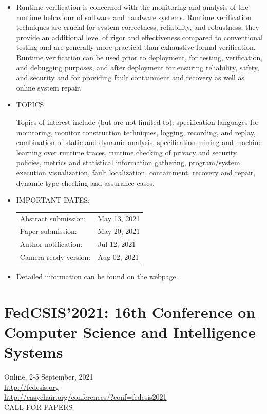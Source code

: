 \documentclass[prodmode,acmtecs]{acmsmall} %
\begin{document}
\begin{itemize}\item  Runtime verification is concerned with the monitoring and analysis of the runtime behaviour of software and hardware systems. Runtime verification techniques are crucial for system correctness, reliability, and robustness; they provide an additional level of rigor and effectiveness compared to conventional testing and are generally more practical than exhaustive formal verification. Runtime verification can be used prior to deployment, for testing, verification, and debugging purposes, and after deployment for ensuring reliability, safety, and security and for providing fault containment and recovery as well as online system repair. 
 
\item  TOPICS 
 
  Topics of interest include (but are not limited to): specification languages for monitoring, monitor construction techniques, logging, recording, and replay, combination of static and dynamic analysis, specification mining and machine learning over runtime traces, runtime checking of privacy and security policies, metrics and statistical information gathering, program/system execution visualization, fault localization, containment, recovery and repair, dynamic type checking and assurance cases.  
 
\item  IMPORTANT DATES:   
 
\begin{tabulary}{\linewidth}{LL}Abstract submission:  & May 13, 2021 \\
Paper submission:  & May 20, 2021 \\
Author notification:  & Jul 12, 2021 \\
Camera-ready version:  & Aug 02, 2021 \\
\end{tabulary}
 
\item  Detailed information can be found on the webpage. 
 
\end{itemize}\section{FedCSIS’2021: 16th Conference on Computer Science and Intelligence Systems}\label{FedCSIS2021}  Online, 2-5 September, 2021 \\ 
  \href{http://fedcsis.org}{http://fedcsis.org}\\ 
  \href{http://easychair.org/conferences/?conf=fedcsis2021}{http://easychair.org/conferences/?conf=fedcsis2021}\\ 
CALL FOR PAPERS 
\end{document}
